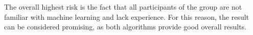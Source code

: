 The overall highest risk is the fact that all participants of the group are not familiar with machine learning and lack 
experience. For this reason, the result can be considered promising, as both algorithms provide good overall results.

%
%
%
%
%

